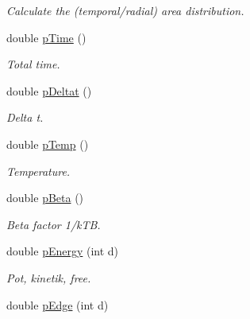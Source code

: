 \begin{DoxyCompactItemize}
\begin{DoxyCompactList}\small\item\em \-Calculate the (temporal/radial) area distribution. \end{DoxyCompactList}\item 
\hypertarget{classVarData_ad5bf6099846e677cae330617688069c8}{double \hyperlink{classVarData_ad5bf6099846e677cae330617688069c8}{p\-Time} ()}\label{classVarData_ad5bf6099846e677cae330617688069c8}

\begin{DoxyCompactList}\small\item\em \-Total time. \end{DoxyCompactList}\item 
\hypertarget{classVarData_af6622c9e9e57aae3faf756b7faa73e29}{double \hyperlink{classVarData_af6622c9e9e57aae3faf756b7faa73e29}{p\-Deltat} ()}\label{classVarData_af6622c9e9e57aae3faf756b7faa73e29}

\begin{DoxyCompactList}\small\item\em \-Delta t. \end{DoxyCompactList}\item 
\hypertarget{classVarData_a495c5b182109864eb1db337d49a53999}{double \hyperlink{classVarData_a495c5b182109864eb1db337d49a53999}{p\-Temp} ()}\label{classVarData_a495c5b182109864eb1db337d49a53999}

\begin{DoxyCompactList}\small\item\em \-Temperature. \end{DoxyCompactList}\item 
\hypertarget{classVarData_af1623f8a2959ef8023d9855a7b2be946}{double \hyperlink{classVarData_af1623f8a2959ef8023d9855a7b2be946}{p\-Beta} ()}\label{classVarData_af1623f8a2959ef8023d9855a7b2be946}

\begin{DoxyCompactList}\small\item\em \-Beta factor 1/k\-T\-B. \end{DoxyCompactList}\item 
\hypertarget{classVarData_a2f2b71871885d7b957cd46bff88cc637}{double \hyperlink{classVarData_a2f2b71871885d7b957cd46bff88cc637}{p\-Energy} (int d)}\label{classVarData_a2f2b71871885d7b957cd46bff88cc637}

\begin{DoxyCompactList}\small\item\em \-Pot, kinetik, free. \end{DoxyCompactList}\item 
\hypertarget{classVarData_ab1955d8a8a364358ea5cb9b22419941d}{double \hyperlink{classVarData_ab1955d8a8a364358ea5cb9b22419941d}{p\-Edge} (int d)}\label{classVarData_ab1955d8a8a364358ea5cb9b22419941d}


\end{DoxyCompactItemize}
